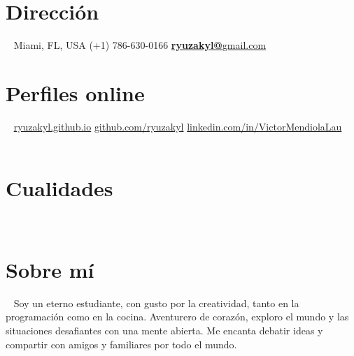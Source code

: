 \documentclass[]{friggeri-cv}
\begin{document}
      

\begin{aside}
  \section{Dirección}
  	~
    Miami, FL, USA
    (+1) 786-630-0166
    \href{mailto:ryuzakyl@gmail.com}{\textbf{ryuzakyl@}gmail.com}
    ~
    ~
    ~
  \section{Perfiles online}
  	~
    \href{https://ryuzakyl.github.io}{{\scriptsize ryuzakyl.github.io}}
    \href{https://github.com/ryuzakyl}{{\scriptsize github.com/ryuzakyl}}
    \href{https://www.linkedin.com/in/victormendiolalau}{{\scriptsize linkedin.com/in/VictorMendiolaLau}}
    ~
    ~
    ~
  \section{Cualidades}
    ~
    ~
    ~
    ~
  \section{Sobre mí}
    ~
    Soy un eterno estudiante, con gusto por la creatividad, tanto en la programación como en la cocina. Aventurero de corazón, exploro el mundo y las situaciones desafiantes con una mente abierta.  Me encanta debatir ideas y compartir con amigos y familiares por todo el mundo.
 \end{aside}
\end{document}

